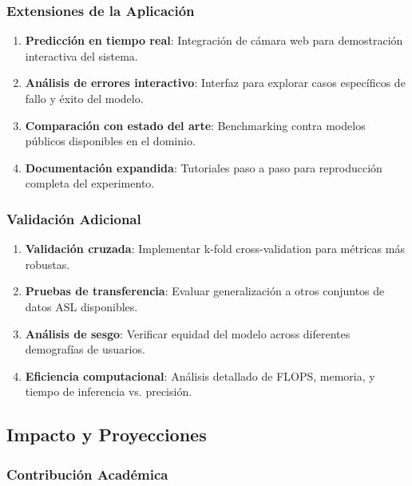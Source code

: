 \documentclass[12pt,a4paper]{article}
\begin{document}
\subsubsection{Extensiones de la Aplicación}

\begin{enumerate}
    \item \textbf{Predicción en tiempo real}: Integración de cámara web para demostración interactiva del sistema.

    \item \textbf{Análisis de errores interactivo}: Interfaz para explorar casos específicos de fallo y éxito del modelo.

    \item \textbf{Comparación con estado del arte}: Benchmarking contra modelos públicos disponibles en el dominio.

    \item \textbf{Documentación expandida}: Tutoriales paso a paso para reproducción completa del experimento.
\end{enumerate}

\subsubsection{Validación Adicional}

\begin{enumerate}
    \item \textbf{Validación cruzada}: Implementar k-fold cross-validation para métricas más robustas.

    \item \textbf{Pruebas de transferencia}: Evaluar generalización a otros conjuntos de datos ASL disponibles.

    \item \textbf{Análisis de sesgo}: Verificar equidad del modelo across diferentes demografías de usuarios.

    \item \textbf{Eficiencia computacional}: Análisis detallado de FLOPS, memoria, y tiempo de inferencia vs. precisión.
\end{enumerate}

\subsection{Impacto y Proyecciones}

\subsubsection{Contribución Académica}
\end{document}
